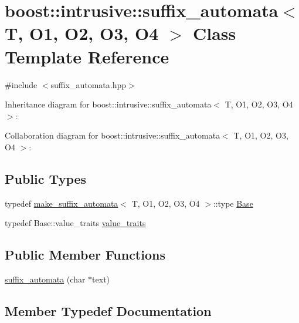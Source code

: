 \hypertarget{classboost_1_1intrusive_1_1suffix__automata}{}\section{boost\+:\+:intrusive\+:\+:suffix\+\_\+automata$<$ T, O1, O2, O3, O4 $>$ Class Template Reference}
\label{classboost_1_1intrusive_1_1suffix__automata}


{\ttfamily \#include $<$suffix\+\_\+automata.\+hpp$>$}



Inheritance diagram for boost\+:\+:intrusive\+:\+:suffix\+\_\+automata$<$ T, O1, O2, O3, O4 $>$\+:


Collaboration diagram for boost\+:\+:intrusive\+:\+:suffix\+\_\+automata$<$ T, O1, O2, O3, O4 $>$\+:
\subsection*{Public Types}
\begin{DoxyCompactItemize}
\item 
typedef \hyperlink{structboost_1_1intrusive_1_1make__suffix__automata}{make\+\_\+suffix\+\_\+automata}$<$ T, O1, O2, O3, O4 $>$\+::type \hyperlink{classboost_1_1intrusive_1_1suffix__automata_af5152d681de2ae59737825d5b2c2b027}{Base}
\item 
typedef Base\+::value\+\_\+traits \hyperlink{classboost_1_1intrusive_1_1suffix__automata_a159d8fbab457d5f8aae6ebb5a98b18c2}{value\+\_\+traits}
\end{DoxyCompactItemize}
\subsection*{Public Member Functions}
\begin{DoxyCompactItemize}
\item 
\hyperlink{classboost_1_1intrusive_1_1suffix__automata_a671eee511bab2df95ef036be104dcefa}{suffix\+\_\+automata} (char $\ast$text)
\end{DoxyCompactItemize}


\subsection{Member Typedef Documentation}
\mbox{\label{classboost_1_1intrusive_1_1suffix__automata_af5152d681de2ae59737825d5b2c2b027}} 
